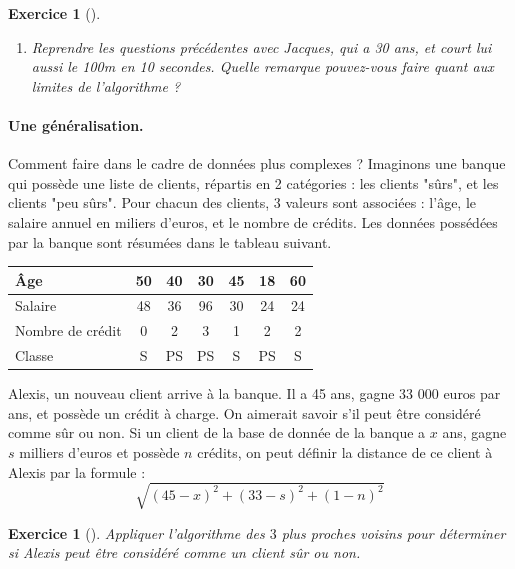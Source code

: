 \documentclass[12pt]{article}                   %
\newcounter{exoscount}
\theoremstyle{exercicestyle}
\newtheorem{exos}[exoscount]{Exercice}
\newenvironment{exo}[2]
  {
   \begin{exos}[#1]
   \leavevmode
   \marginpar{\hfill $#2 $ }}
  {\end{exos}}
\theoremstyle{break2}
\theoremstyle{break3}
\begin{document}
\begin{exo}{}{  }
\begin{enumerate}
        \dotfill

        \dotfill
    \item Reprendre les questions précédentes avec Jacques, qui a 30 ans, et court lui aussi le 100m en 10 secondes. Quelle remarque pouvez-vous faire quant aux limites de l'algorithme ?
        

        \dotfill

        \dotfill

        \dotfill
    \end{enumerate}
    \label{exo:limites}

\end{exo} 

\paragraph{Une généralisation.} Comment faire dans le cadre de données plus complexes ? Imaginons une banque qui possède une liste de clients, répartis en 2 catégories : les clients "sûrs", et les clients "peu sûrs". Pour chacun des clients, 3 valeurs sont associées : l'âge, le salaire annuel en miliers d'euros, et le nombre de crédits. Les données possédées par la banque sont résumées dans le tableau suivant. 

\begin{center}
    \renewcommand{\arraystretch}{1.5}
   \begin{tabular}{|M{4cm}|c|c|c|c|c|c|}
       \hline
       Âge              & 50 & 40 & 30 & 45 & 18 & 60 \\
       \hline
       Salaire          & 48 & 36 & 96 & 30 & 24 & 24 \\
       \hline
       Nombre de crédit & 0 & 2 & 3 &1 & 2 &2 \\
       \hline
       Classe           &  S & PS & PS & S & PS & S \\
       \hline
   \end{tabular} 
\end{center}

Alexis, un nouveau client arrive à la banque. Il a 45 ans, gagne 33 000 euros par ans, et possède un crédit à charge. On aimerait savoir s'il peut être considéré comme sûr ou non. Si un client de la base de donnée de la banque a $x$ ans, gagne $s$ milliers d'euros et possède $n$ crédits, on peut définir la distance de ce client à Alexis par la formule :
$$
\sqrt{(45 - x)^2 + (33 - s)^2 + (1-n)^2}
$$
\begin{exo}{}{  }
    Appliquer l'algorithme des $3$ plus proches voisins pour déterminer si Alexis peut être considéré comme un client sûr ou non. 

    \noindent
        \dotfill

    \noindent
        \dotfill

    \noindent
        \dotfill

    \noindent
        \dotfill
\end{exo} 
\end{document}
